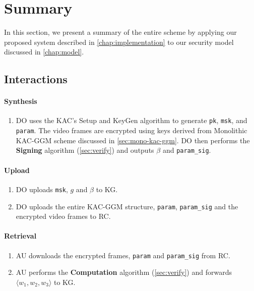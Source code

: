 \documentclass[hyp,a4paper,12pt,openbib]{socreport}
\begin{document}
\section{Summary}
\label{sec:summary}
In this section, we present a summary of the entire scheme by applying our proposed system described in \cref{chap:implementation} to our security model discussed in \cref{chap:model}. 

\subsection{Interactions}

\paragraph{Synthesis}
\begin{enumerate} 

\item DO uses the KAC's Setup and KeyGen algorithm to generate \texttt{pk}, \texttt{msk}, and \texttt{param}. The video frames are encrypted using keys derived from Monolithic KAC-GGM scheme discussed in \cref{sec:mono-kac-ggm}. DO then performs the \textbf{Signing} algorithm (\cref{sec:verify}) and outputs $\beta$ and \texttt{param\_sig}. 
\end{enumerate}

\paragraph{Upload}
\begin{enumerate}
\item DO uploads \texttt{msk}, $g$ and $\beta$ to KG.
\item DO uploads the entire KAC-GGM structure, \texttt{param}, \texttt{param\_sig} and the encrypted video frames to RC.

\end{enumerate}

\paragraph{Retrieval}
\begin{enumerate}
\item AU downloads the encrypted frames, \texttt{param} and \texttt{param\_sig} from RC.
\item AU performs the \textbf{Computation} algorithm (\cref{sec:verify}) and forwards $\langle w_1 , w_2, w_3\rangle$ to KG.
\end{enumerate}
\end{document}
